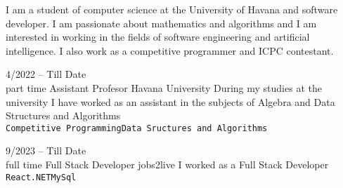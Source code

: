 \documentclass[9pt]{developercv} %
\begin{document}
\vspace{0.5cm}





\begin{minipage}[t]{0.4\textwidth} %
	\vspace{-\baselineskip} %

	I am a student of computer science at the University of Havana and software developer. I am passionate
	about mathematics and algorithms and I am interested in working in the fields of software engineering and
	artificial intelligence. I also work as a competitive programmer and ICPC contestant.
\end{minipage}
\hfill %
\begin{minipage}[t]{0.5\textwidth} %
	\vspace{-\baselineskip} %
	\begin{barchart}{5.5}
	\end{barchart}
\end{minipage}

\begin{center}
\end{center}



\begin{entrylist}
	\entry
	{4/2022 -- Till Date\\\footnotesize{part time}}
	{Assistant Profesor}
	{Havana University}
	{During my studies at the university I have worked as an assistant in the subjects of Algebra
		and Data Structures and Algorithms\\ \texttt{Competitive Programming}\slashsep\texttt{Data Sructures and Algorithms}}

	\entry
	{9/2023 -- Till Date\\\footnotesize{full time}}
	{Full Stack Developer}
	{jobs2live}
	{I worked as a Full Stack Developer\\ \texttt{React}\slashsep\texttt{.NET}\slashsep\texttt{MySql}}

\end{entrylist}
\end{document}
